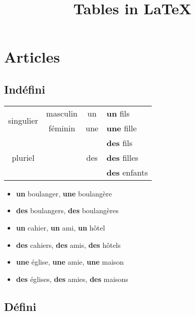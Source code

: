 \documentclass[12pt]{article}  %
\begin{document}
 

\newcommand{\bo}[1]{\textbf{#1}}
\newcommand{\rarrow}{\begin{math}\to\ \end{math}}


\title{\LARGE Tables in \LaTeX }

\section{Articles} 

\subsection{Indéfini}

\begin{tabular}{| c | c | c | l |}
  \hline                       
  \multirow{2}{*}{singulier} 
  	& masculin      & un & \bo{un} fils  \\ \cline{2-4}
  	& féminin       & une & \bo{une} fille \\ \cline{2-4}
  \multirow{3}{*}{pluriel} 
  	& & \multirow{3}{*}{des} & \bo{des} fils \\ \cline{4-4}
    & &  & \bo{des} filles \\ \cline{4-4}
    & &  & \bo{des} enfants \\
  \hline  
\end{tabular}

\begin{itemize}
  \item \bo{un} boulanger, \bo{une} boulangère 
  \item \bo{des} boulangers, \bo{des} boulangères
  \item \bo{un} cahier, \bo{un} ami, \bo{un} hôtel
  \item \bo{des} cahiers, \bo{des} amis, \bo{des} hôtels
  \item \bo{une} église, \bo{une} amie, \bo{une} maison
  \item \bo{des} églises, \bo{des} amies, \bo{des} maisons
\end{itemize}

\subsection{Défini}
\end{document}
